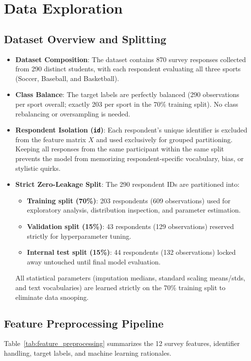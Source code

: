 \documentclass[12pt]{article}
\begin{document}
\section{Data Exploration}\label{sec:data-exploration}

\subsection*{Dataset Overview and Splitting}
\begin{itemize}[leftmargin=1.5em]
    \item \textbf{Dataset Composition}: The dataset contains 870 survey responses collected from 290 distinct students, with each respondent evaluating all three sports (Soccer, Baseball, and Basketball).
    \item \textbf{Class Balance}: The target labels are perfectly balanced (290 observations per sport overall; exactly 203 per sport in the 70\% training split). No class rebalancing or oversampling is needed.
    \item \textbf{Respondent Isolation (\texttt{id})}: Each respondent's unique identifier is excluded from the feature matrix $X$ and used exclusively for grouped partitioning. Keeping all responses from the same participant within the same split prevents the model from memorizing respondent-specific vocabulary, bias, or stylistic quirks.
    \item \textbf{Strict Zero-Leakage Split}: The 290 respondent IDs are partitioned into:
    \begin{itemize}
        \item \textbf{Training split (70\%)}: 203 respondents (609 observations) used for exploratory analysis, distribution inspection, and parameter estimation.
        \item \textbf{Validation split (15\%)}: 43 respondents (129 observations) reserved strictly for hyperparameter tuning.
        \item \textbf{Internal test split (15\%)}: 44 respondents (132 observations) locked away untouched until final model evaluation.
    \end{itemize}
    All statistical parameters (imputation medians, standard scaling means/stds, and text vocabularies) are learned strictly on the 70\% training split to eliminate data snooping.
\end{itemize}

\subsection*{Feature Preprocessing Pipeline}
Table~\ref{tab:feature_preprocessing} summarizes the 12 survey features, identifier handling, target labels, and machine learning rationales.
\end{document}
